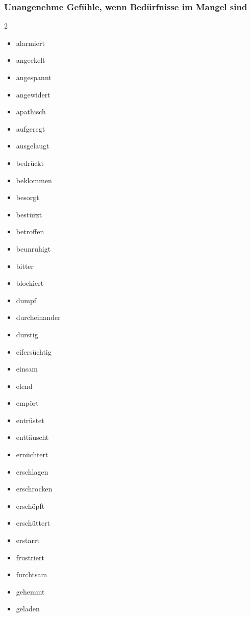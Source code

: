 \subsubsection{Unangenehme Gefühle, wenn Bedürfnisse im Mangel sind}
\label{unangenehme-gefuehle}

\begin{multicols}{2}
    \begin{itemize}
        \item alarmiert
        \item angeekelt
        \item angespannt
        \item angewidert
        \item apathisch
        \item aufgeregt
        \item ausgelaugt
        \item bedrückt
        \item beklommen
        \item besorgt
        \item bestürzt
        \item betroffen
        \item beunruhigt
        \item bitter
        \item blockiert
        \item dumpf
        \item durcheinander
        \item durstig
        \item eifersüchtig
        \item einsam
        \item elend
        \item empört
        \item entrüstet
        \item enttäuscht
        \item ernüchtert
        \item erschlagen
        \item erschrocken
        \item erschöpft
        \item erschüttert
        \item erstarrt
        \item frustriert
        \item furchtsam
        \item gehemmt
        \item geladen

\end{itemize}
\end{multicols}
